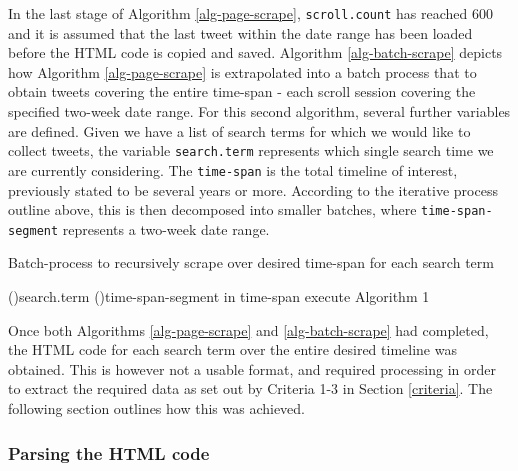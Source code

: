 \documentclass{article}
\begin{document}
\vspace{5mm}

In the last stage of Algorithm \eqref{alg-page-scrape}, \texttt{scroll.count} has reached 600 and it is assumed that the last tweet within the date range has been loaded before the HTML code is copied and saved.
Algorithm \eqref{alg-batch-scrape} depicts how Algorithm \eqref{alg-page-scrape} is extrapolated into a batch process that to obtain tweets covering the entire time-span - each scroll session covering the specified two-week date range. For this second algorithm, several further variables are defined. Given we have a list of search terms for which we would like to collect tweets, the variable \texttt{search.term} represents which single search time we are currently considering. The \texttt{time-span} is the total timeline of interest, previously stated to be several years or more. According to the iterative process outline above, this is then decomposed into smaller batches, where \texttt{time-span-segment} represents a two-week date range.

\vspace{5mm}

\begin{algorithm}[H]
  \caption{Batch-process to recursively scrape over desired time-span for each search term}
  \label{alg-batch-scrape}

  \BlankLine
  \BlankLine

  \BlankLine

  \ForEach(){search.term} {
    \ForEach(){time-span-segment in time-span} {
      execute Algorithm 1\;
    }
  }   
\end{algorithm}

\vspace{5mm}

Once both Algorithms \eqref{alg-page-scrape} and \eqref{alg-batch-scrape} had completed, the HTML code for each search term over the entire desired timeline was obtained. This is however not a usable format, and required processing in order to extract the required data as set out by Criteria 1-3 in Section \ref{criteria}. The following section outlines how this was achieved.


\subsubsection{Parsing the HTML code \label{html-parsing}}
\label{sec-1-3-4}
\end{document}
